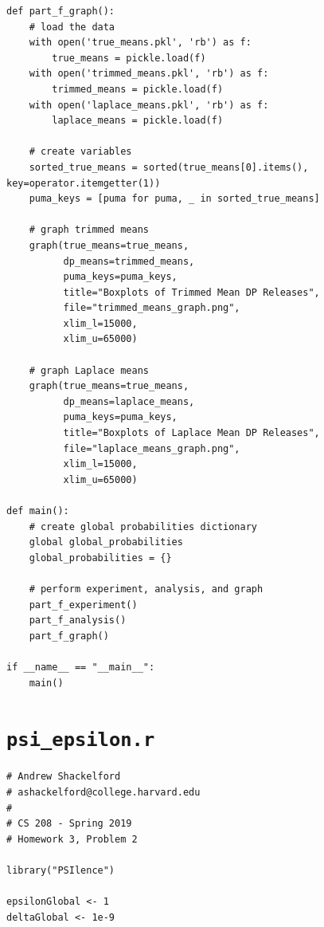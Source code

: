 \documentclass[12pt]{article}
\def\cl{\lstinline}
\begin{document}
\begin{appendices}
\begin{lstlisting}
def part_f_graph():
    # load the data
    with open('true_means.pkl', 'rb') as f:
        true_means = pickle.load(f)
    with open('trimmed_means.pkl', 'rb') as f:
        trimmed_means = pickle.load(f)
    with open('laplace_means.pkl', 'rb') as f:
        laplace_means = pickle.load(f)

    # create variables
    sorted_true_means = sorted(true_means[0].items(), key=operator.itemgetter(1))
    puma_keys = [puma for puma, _ in sorted_true_means]

    # graph trimmed means
    graph(true_means=true_means,
          dp_means=trimmed_means,
          puma_keys=puma_keys,
          title="Boxplots of Trimmed Mean DP Releases",
          file="trimmed_means_graph.png",
          xlim_l=15000,
          xlim_u=65000)

    # graph Laplace means
    graph(true_means=true_means,
          dp_means=laplace_means,
          puma_keys=puma_keys,
          title="Boxplots of Laplace Mean DP Releases",
          file="laplace_means_graph.png",
          xlim_l=15000,
          xlim_u=65000)

def main():
    # create global probabilities dictionary
    global global_probabilities
    global_probabilities = {}

    # perform experiment, analysis, and graph
    part_f_experiment()
    part_f_analysis()
    part_f_graph()

if __name__ == "__main__":
    main()
\end{lstlisting}

\newpage

\section{\cl{psi_epsilon.r}}
\label{appendix:psi_epsilon}

{

\begin{lstlisting}
# Andrew Shackelford
# ashackelford@college.harvard.edu
#
# CS 208 - Spring 2019
# Homework 3, Problem 2

library("PSIlence")

epsilonGlobal <- 1
deltaGlobal <- 1e-9


\end{lstlisting}}
\end{appendices}
\end{document}
